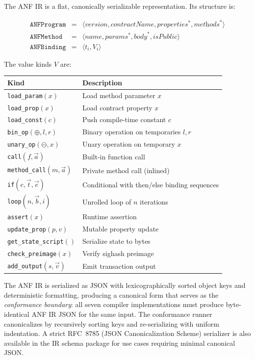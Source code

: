 \documentclass[11pt,a4paper]{article}
\begin{document}
The ANF IR is a flat, canonically serializable representation. Its structure
is:

\[
\begin{array}{rcl}
\texttt{ANFProgram} &=& \langle \textit{version}, \textit{contractName}, \textit{properties}^*, \textit{methods}^* \rangle \\
\texttt{ANFMethod} &=& \langle \textit{name}, \textit{params}^*, \textit{body}^*, \textit{isPublic} \rangle \\
\texttt{ANFBinding} &=& \langle t_i, V_i \rangle
\end{array}
\]

The value kinds $V$ are:

\begin{center}
\small
\begin{tabular}{@{}ll@{}}
\toprule
\textbf{Kind} & \textbf{Description} \\
\midrule
\texttt{load\_param}$(x)$ & Load method parameter $x$ \\
\texttt{load\_prop}$(x)$ & Load contract property $x$ \\
\texttt{load\_const}$(c)$ & Push compile-time constant $c$ \\
\texttt{bin\_op}$(\oplus, l, r)$ & Binary operation on temporaries $l, r$ \\
\texttt{unary\_op}$(\ominus, x)$ & Unary operation on temporary $x$ \\
\texttt{call}$(f, \vec{a})$ & Built-in function call \\
\texttt{method\_call}$(m, \vec{a})$ & Private method call (inlined) \\
\texttt{if}$(c, \vec{t}, \vec{e})$ & Conditional with then/else binding sequences \\
\texttt{loop}$(n, \vec{b}, i)$ & Unrolled loop of $n$ iterations \\
\texttt{assert}$(x)$ & Runtime assertion \\
\texttt{update\_prop}$(p, v)$ & Mutable property update \\
\texttt{get\_state\_script}$ ()$ & Serialize state to bytes \\
\texttt{check\_preimage}$(x)$ & Verify sighash preimage \\
\texttt{add\_output}$(s, \vec{v})$ & Emit transaction output \\
\bottomrule
\end{tabular}
\end{center}

The ANF IR is serialized as JSON with lexicographically sorted object keys
and deterministic formatting, producing a canonical form that serves as the
\emph{conformance boundary}: all seven compiler implementations must produce
byte-identical ANF IR JSON for the same input. The conformance runner
canonicalizes by recursively sorting keys and re-serializing with uniform
indentation. A strict RFC~8785 (JSON Canonicalization Scheme) serializer
is also available in the IR schema package for use cases requiring minimal
canonical JSON.
\end{document}
